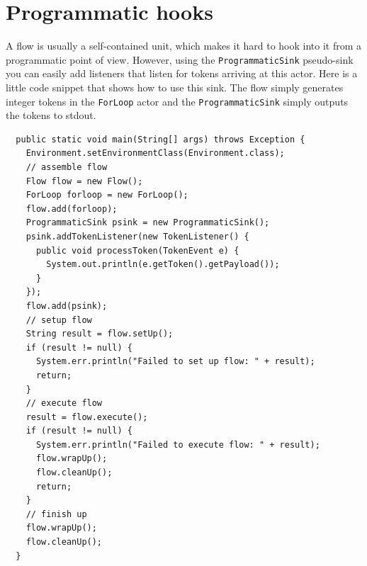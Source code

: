 \section{Programmatic hooks}
A flow is usually a self-contained unit, which makes it hard to hook into it
from a programmatic point of view. However, using the \texttt{ProgrammaticSink}
pseudo-sink you can easily add listeners that listen for tokens arriving at
this actor.
Here is a little code snippet that shows how to use this sink. The flow simply
generates integer tokens in the \texttt{ForLoop} actor and the \texttt{ProgrammaticSink}
simply outputs the tokens to stdout.
\begin{verbatim}
  public static void main(String[] args) throws Exception {
    Environment.setEnvironmentClass(Environment.class);
    // assemble flow
    Flow flow = new Flow();
    ForLoop forloop = new ForLoop();
    flow.add(forloop);
    ProgrammaticSink psink = new ProgrammaticSink();
    psink.addTokenListener(new TokenListener() {
      public void processToken(TokenEvent e) {
        System.out.println(e.getToken().getPayload());
      }
    });
    flow.add(psink);
    // setup flow
    String result = flow.setUp();
    if (result != null) {
      System.err.println("Failed to set up flow: " + result);
      return;
    }
    // execute flow
    result = flow.execute();
    if (result != null) {
      System.err.println("Failed to execute flow: " + result);
      flow.wrapUp();
      flow.cleanUp();
      return;
    }
    // finish up
    flow.wrapUp();
    flow.cleanUp();
  }
\end{verbatim}
